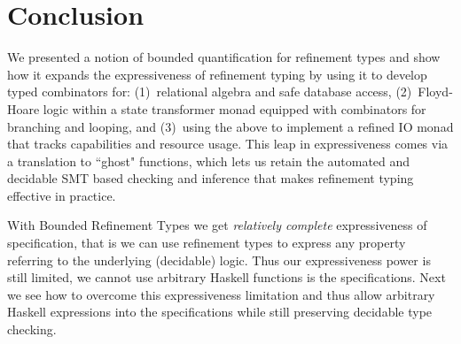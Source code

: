 \section{Conclusion} \label{sec:boundedrefinementtypes:conclusion}
We presented a notion of bounded quantification for refinement types
and show how it expands the expressiveness of refinement typing
by using it to develop typed combinators for:
%
(1)~relational algebra and safe database access,
%
(2)~Floyd-Hoare logic within a state transformer
    monad equipped with combinators for branching
    and looping, and
%
(3)~using the above to implement a refined IO
    monad that tracks capabilities and resource usage.
%
This leap in expressiveness comes via a translation to ``ghost" functions,
which lets us retain the automated and decidable SMT based checking and
inference that makes refinement typing effective in practice.

With Bounded Refinement Types we get \textit{relatively complete} 
expressiveness of specification, that is we can use refinement types
to express any property referring to the underlying (decidable) logic. 
%
Thus our expressiveness power is still limited, 
we cannot use arbitrary Haskell functions is the specifications. 
%
Next we see how to overcome this expressiveness limitation 
and thus allow arbitrary Haskell expressions into the specifications
while still preserving decidable type checking. 